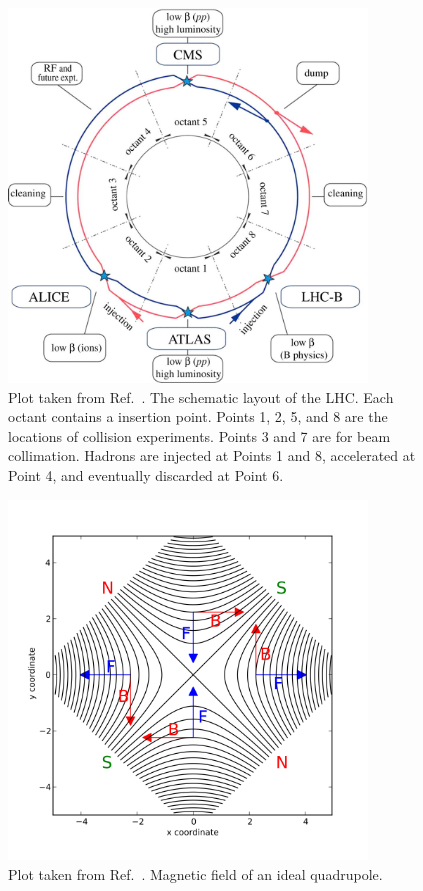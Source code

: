 \begin{figure}[!htb]
    \centering
    \captionsetup{justification=justified}
    \includegraphics[width=0.85\textwidth]{pics/LHC_CMS/LHC_scheme.jpg}
    \caption{Plot taken from Ref.~\cite{Evans_2008}. 
             The schematic layout of the LHC. Each octant contains a insertion point.
             Points 1, 2, 5, and 8 are the locations of collision experiments. Points 3 and 7 are for beam collimation. 
             Hadrons are injected at Points 1 and 8, accelerated at Point 4, and eventually discarded at Point 6.}
    \label{fig:lhc_scheme}
\end{figure}

\begin{figure}[!htb]
    \centering
    \captionsetup{justification=centering}
    \includegraphics[width=0.85\textwidth]{pics/LHC_CMS/quadrupole_field.png}
    \caption{Plot taken from Ref.~\cite{quadrupole_wiki}. 
             Magnetic field of an ideal quadrupole.}
    \label{fig:quad_field}
\end{figure}

